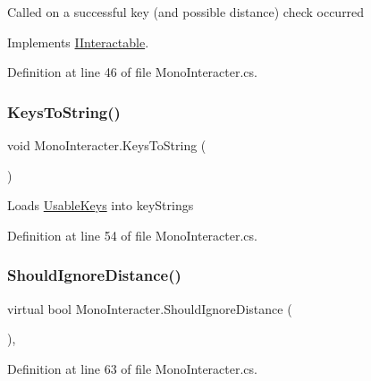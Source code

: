 Called on a successful key (and possible distance) check occurred



Implements \mbox{\hyperlink{interface_i_interactable_ae38fb77e97bc1066db045b32db647681}{I\+Interactable}}.



Definition at line 46 of file Mono\+Interacter.\+cs.

\mbox{\label{class_mono_interacter_a704a1522a1fad421361e62c04161132f}} 
\subsubsection{\texorpdfstring{Keys\+To\+String()}{KeysToString()}}
{\footnotesize\ttfamily void Mono\+Interacter.\+Keys\+To\+String (\begin{DoxyParamCaption}{ }\end{DoxyParamCaption})\hspace{0.3cm}{\ttfamily [protected]}}



Loads \mbox{\hyperlink{class_mono_interacter_a29fdba9686647d0a6c83244a8c17973a}{Usable\+Keys}} into key\+Strings 



Definition at line 54 of file Mono\+Interacter.\+cs.

\mbox{\label{class_mono_interacter_af09c79465a1a2a721c8a841405e608fa}} 
\subsubsection{\texorpdfstring{Should\+Ignore\+Distance()}{ShouldIgnoreDistance()}}
{\footnotesize\ttfamily virtual bool Mono\+Interacter.\+Should\+Ignore\+Distance (\begin{DoxyParamCaption}{ }\end{DoxyParamCaption})\hspace{0.3cm}{\ttfamily [protected]}, {\ttfamily [virtual]}}



Definition at line 63 of file Mono\+Interacter.\+cs.



